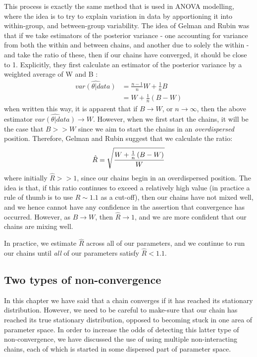 \documentclass[11pt,fullpage]{book}
\begin{document}
This process is exactly the same method that is used in ANOVA modelling, where the idea is to try to explain variation in data by apportioning it into within-group, and between-group variability. The idea of Gelman and Rubin was that if we take estimators of the posterior variance - one accounting for variance from both the within and between chains, and another due to solely the within - and take the ratio of these, then if our chains have converged, it should be close to 1. Explicitly, they first calculate an estimator of the posterior variance by a weighted average of W and B \cite{gelman2013bayesian}:
%
\begin{equation}
\begin{align}
\widehat{var(\theta|data)} &= \frac{n-1}{n} W + \frac{1}{n} B\\
&= W + \frac{1}{n} \left(B - W\right)
\end{align}
\end{equation}
%
when written this way, it is apparent that if $B\rightarrow W$, or $n\rightarrow\infty$, then the above estimator $\widehat{var(\theta|data)}\rightarrow W$. However, when we first start the chains, it will be the case that $B>>W$ since we aim to start the chains in an \textit{overdispersed} position. Therefore, Gelman and Rubin suggest that we calculate the ratio:
%
\begin{equation}\label{eq:metropolisHastings_Rhat}\index{R hat}
\hat{R} = \sqrt{\frac{W + \frac{1}{n} \left(B - W\right)}{W}}
\end{equation}
%
where initially $\hat{R}>>1$, since our chains begin in an overdispersed position. The idea is that, if this ratio continues to exceed a relatively high value (in practice a rule of thumb is to use $\hat{R}\sim 1.1$ as a cut-off), then our chains have not mixed well, and we hence cannot have any confidence in the assertion that convergence has occurred. However, as $B\rightarrow W$, then $\hat{R}\rightarrow 1$, and we are more confident that our chains are mixing well.

In practice, we estimate $\hat{R}$ across all of our parameters, and we continue to run our chains until \textit{all} of our parameters satisfy $\hat{R} < 1.1$. 

\subsection{Two types of non-convergence}
In this chapter we have said that a chain converges if it has reached its stationary distribution. However, we need to be careful to make-sure that our chain has reached its true stationary distribution, opposed to becoming stuck in one area of parameter space. In order to increase the odds of detecting this latter type of non-convergence, we have discussed the use of using multiple non-interacting chains, each of which is started in some dispersed part of parameter space. 
\end{document}
